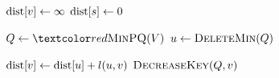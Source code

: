 
\begin{algorithm}[H]
  \begin{algorithmic}
      \State $\text{dist}[v] \gets \infty$
    \EndFor
    \State $\text{dist}[s] \gets 0$

    \Statex
    \State $Q \gets \red{\textsc{MinPQ}}(V)$
      \State $u \gets \textsc{DeleteMin}(Q)$

      \hStatex
	  \State $\text{dist}[v] \gets \text{dist}[u] + l(u,v)$
	  \State $\textsc{DecreaseKey}(Q, v)$
	\EndIf
      \EndFor
    \EndWhile
  \end{algorithmic}
\end{algorithm}
